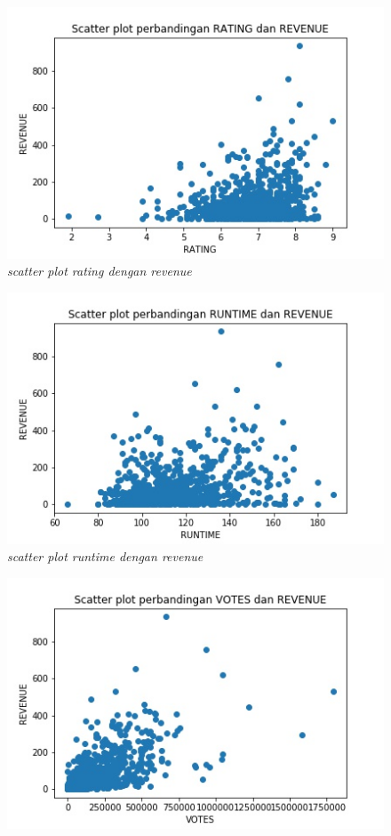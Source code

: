 \documentclass[a4paper,twoside]{article}
\begin{document}
\begin{enumerate}
\begin{figure}[h!]
		\centering  
		\includegraphics[scale=0.7]{scatterp-RATING-REVENUE}   
		\caption{\textit{scatter plot rating dengan revenue}}
		\label{fig:scatterp-rating-revenue} 
\end{figure}
\begin{figure}[h!]
		\centering  
		\includegraphics[scale=0.7]{scatterp-runtime-REVENUE}   
		\caption{\textit{scatter plot runtime dengan revenue}}
		\label{fig:scatterp-runtime-revenue} 
\end{figure}
\pagebreak
\begin{figure}[h!]
		\centering  
		\includegraphics[scale=0.7]{scatterp-VOTES-REVENUE}   

\end{figure}
\end{enumerate}
\end{document}
